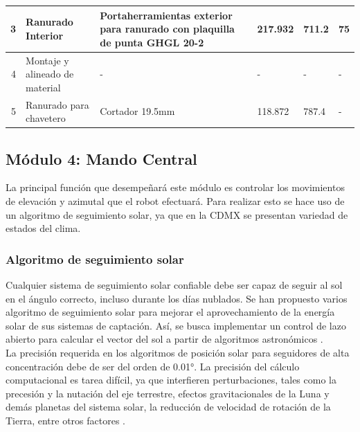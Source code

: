 \begin{table}[H]
\begin{tabular}{|r|p{10.75em}|p{11em}|p{3em}|p{3.25em}|p{3.5em}|}
    \hline
    \scriptsize 3     & \scriptsize Ranurado Interior & \scriptsize Portaherramientas exterior para ranurado con plaquilla de punta GHGL 20-2 & \scriptsize 217.932 & \scriptsize 711.2 & \scriptsize 75 \\
    \hline
    \scriptsize 4     & \scriptsize Montaje y alineado de material & \scriptsize -     & \scriptsize {-} & \scriptsize{-} & \scriptsize - \\
    \hline
    \scriptsize 5     & \scriptsize Ranurado para chavetero & \scriptsize Cortador 19.5mm & \scriptsize 118.872 & \scriptsize 787.4 & \scriptsize - \\
    \hline
    \end{tabular}%
  \label{tab:EL_ME1}%
\end{table}%












\newpage
\subsection{Módulo 4: Mando Central}
La principal función que desempeñará este módulo es controlar los movimientos de elevación y azimutal que el robot efectuará. Para realizar esto se hace uso de un algoritmo de seguimiento solar, ya que en la CDMX se presentan variedad de estados del clima. 

\subsubsection{Algoritmo de seguimiento solar}
Cualquier sistema de seguimiento solar confiable debe ser capaz de seguir al sol en el ángulo correcto, incluso durante los días nublados. Se han propuesto varios algoritmo de seguimiento solar para mejorar el aprovechamiento de la energía solar de sus sistemas de captación. Así, se busca implementar un control de lazo abierto para calcular el vector del sol a partir de algoritmos astronómicos \cite{DDC1}.\\

La precisión requerida en los algoritmos de posición solar para seguidores de alta concentración debe de ser del orden de 0.01°. La precisión del cálculo computacional es tarea difícil, ya que interfieren perturbaciones, tales como la precesión y la nutación del eje terrestre, efectos gravitacionales de la Luna y demás planetas del sistema solar, la reducción de velocidad de rotación de la Tierra, entre otros factores \cite{DDC2}. \\

